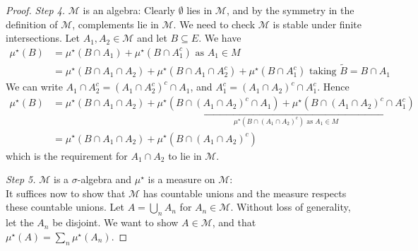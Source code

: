 \begin{proof}
	\emph{Step 4.} $\mathcal M$ is an algebra:
	Clearly $\emptyset$ lies in $\mathcal M$, and by the symmetry in the definition of $\mathcal M$, complements lie in $\mathcal M$.
	We need to check $\mathcal M$ is stable under finite intersections.
	Let $A_1, A_2 \in \mathcal M$ and let $B \subseteq E$.
	We have
	\begin{align*}
		\mu^\star(B) &= \mu^\star(B \cap A_1) + \mu^\star(B \cap A_1^c) \text{ as $A_1 \in M$} \\
		&= \mu^\star(B \cap A_1 \cap A_2) + \mu^\star(B \cap A_1 \cap A_2^c) + \mu^\star(B \cap A_1^c) \text{ taking $\tilde{B} = B \cap A_1$}
	\end{align*}
	We can write $A_1 \cap A_2^c = (A_1 \cap A_2^c)^c \cap A_1$, and $A_1^c = (A_1 \cap A_2)^c \cap A_1^c$.
	Hence
	\begin{align*}
		\mu^\star(B) &= \mu^\star(B \cap A_1 \cap A_2) + \underbracket{\mu^\star(B \cap (A_1 \cap A_2)^c \cap A_1) + \mu^\star(B \cap (A_1 \cap A_2)^c \cap A_1^c)}_{\mu^\star(B \cap (A_1 \cap A_2)^c) \text{ as } A_1 \in M} \\
		&= \mu^\star(B \cap A_1 \cap A_2) + \mu^\star(B \cap (A_1 \cap A_2)^c)
	\end{align*}
	which is the requirement for $A_1 \cap A_2$ to lie in $\mathcal M$.

	\emph{Step 5.} $\mathcal M$ is a $\sigma$-algebra and $\mu^\star$ is a measure on $\mathcal M$: \\
	It suffices now to show that $\mathcal M$ has countable unions and the measure respects these countable unions.
	Let $A = \bigcup_n A_n$ for $A_n \in \mathcal M$.
	Without loss of generality, let the $A_n$ be disjoint.
	We want to show $A \in \mathcal M$, and that $\mu^\star(A) = \sum_n \mu^\star(A_n)$.


\end{proof}
